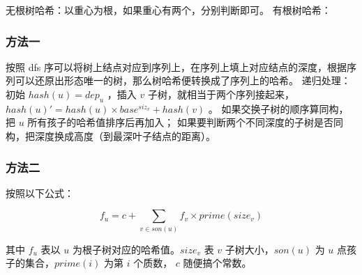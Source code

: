\begin{small}
无根树哈希：以重心为根，如果重心有两个，分别判断即可。
有根树哈希：

\subsubsection{方法一}  
按照 dfs 序可以将树上结点对应到序列上，在序列上填上对应结点的深度，根据序列可以还原出形态唯一的树，那么树哈希便转换成了序列上的哈希。  
递归处理：初始 $hash(u)=dep_u$ ，插入 $v$ 子树，就相当于两个序列接起来，$hash(u)'=hash(u)\times base^{siz_v}+hash(v)$ 。  
如果交换子树的顺序算同构，把 $u$ 所有孩子的哈希值排序后再加入；  
如果要判断两个不同深度的子树是否同构，把深度换成高度（到最深叶子结点的距离）。  

\subsubsection{方法二}
按照以下公式：

\[
f_{u}=c+\sum_{v\in son(u)} f_{v}\times prime(size_{v})
\]

其中 $f_u$ 表以 $u$ 为根子树对应的哈希值。$size_v$ 表 $v$ 子树大小，$son(u)$ 为 $u$ 点孩子的集合，$prime(i)$ 为第 $i$ 个质数， $c$ 随便搞个常数。

\end{small}